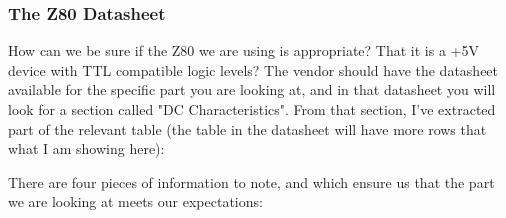 \subsubsection{The Z80 Datasheet}

How can we be sure if the Z80 we are using is appropriate? That it is a +5V device with TTL compatible logic levels? The vendor should have the datasheet available for the specific part you are looking at, and in that datasheet you will look for a section called "DC Characteristics". From that section, I've extracted part of the relevant table (the table in the datasheet will have more rows that what I am showing here):



There are four pieces of information to note, and which ensure us that the part we are looking at meets our expectations:

